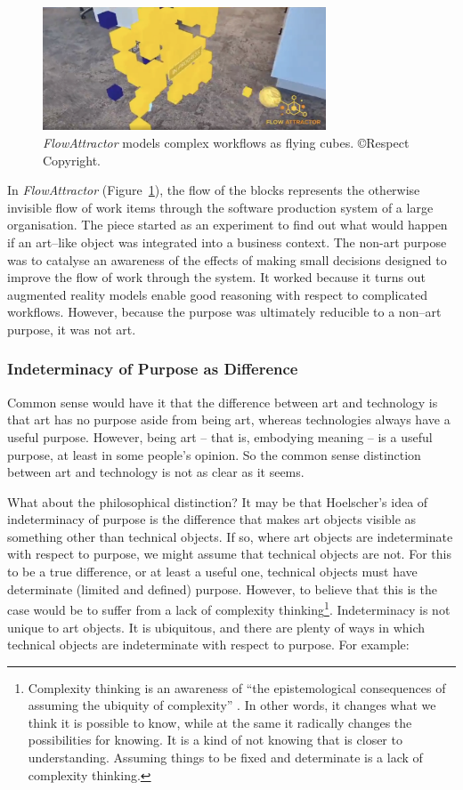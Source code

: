 \documentclass[letterpaper]{article}
\begin{document}
    \begin{figure}[h]
        \includegraphics[width=3.31in]{flow-attractor.png}
        \caption{\emph{FlowAttractor} models complex workflows as flying cubes. \copyright Respect Copyright.}
        \label{fig:flow-attractor}
    \end{figure}

    In \emph{FlowAttractor} (Figure~\ref{fig:flow-attractor}), the flow of the blocks represents the otherwise invisible flow of work items through the software production system of a large organisation. The piece started as an experiment to find out what would happen if an art–like object was integrated into a business context. The non-art purpose was to catalyse an awareness of the effects of making small decisions designed to improve the flow of work through the system. It worked because it turns out augmented reality models enable good reasoning with respect to complicated workflows. However, because the purpose was ultimately reducible to a non–art purpose, it was not art.

    \subsubsection{Indeterminacy of Purpose as Difference}

    Common sense would have it that the difference between art and technology is that art has no purpose aside from being art, whereas technologies always have a useful purpose. However, being art – that is, embodying meaning – is a useful purpose, at least in some people's opinion. So the common sense distinction between art and technology is not as clear as it seems.

    What about the philosophical distinction? It may be that Hoelscher's idea of indeterminacy of purpose is the difference that makes art objects visible as something other than technical objects. If so, where art objects are indeterminate with respect to purpose, we might assume that technical objects are not. For this to be a true difference, or at least a useful one, technical objects must have determinate (limited and defined) purpose. However, to believe that this is the case would be to suffer from a lack of complexity thinking\footnote{
        Complexity thinking is an awareness of “the epistemological consequences of assuming the ubiquity of complexity” \citep{CilliersRichardsonCmplxtyScnc2001}. In other words, it changes what we think it is possible to know, while at the same it radically changes the possibilities for knowing. It is a kind of not knowing that is closer to understanding. Assuming things to be fixed and determinate is a lack of complexity thinking.
    }. Indeterminacy is not unique to art objects. It is ubiquitous, and there are plenty of ways in which technical objects are indeterminate with respect to purpose. For example:
\end{document}
